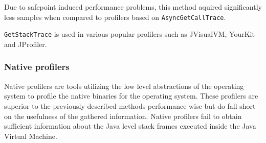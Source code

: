 \documentclass[..thesis.tex]{subfiles}
\begin{document}
Due to safepoint induced performance problems, this method aquired significantly less samples when compared to profilers based on \texttt{Async\-Get\-Call\-Trace}.

\texttt{GetStackTrace} is used in various popular profilers such as JVisualVM, YourKit and JProfiler. \cite{visualvm}

\subsubsection{Native profilers}
Native profilers are tools utilizing the low level abstractions of the operating system to  profile the native binaries for the operating system. These profilers are superior to the previously described methods performance wise but do fall short on the usefulness of the gathered information. Native profilers fail to obtain sufficient information about the Java level stack frames executed inside the Java Virtual Machine. 
\end{document}
